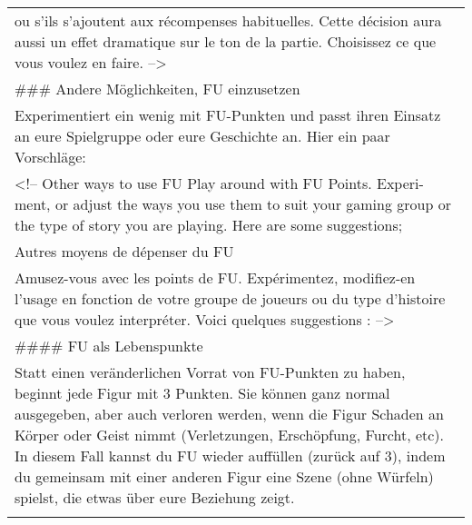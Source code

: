 \documentclass[]{article}
\begin{document}
\begin{longtable}[]{@{}l@{}}
\begin{minipage}[t]{0.05\columnwidth}
ou s'ils s'ajoutent aux récompenses habituelles. Cette décision aura
aussi un effet dramatique sur le ton de la partie. Choisissez ce que
vous voulez en faire. --\textgreater{}
\strut\end{minipage}\tabularnewline
\begin{minipage}[t]{0.05\columnwidth}\raggedright\strut
\#\#\# Andere Möglichkeiten, FU einzusetzen
\strut\end{minipage}\tabularnewline
\begin{minipage}[t]{0.05\columnwidth}\raggedright\strut
Experimentiert ein wenig mit FU-Punkten und passt ihren Einsatz an eure
Spielgruppe oder eure Geschichte an. Hier ein paar Vorschläge:
\strut\end{minipage}\tabularnewline
\begin{minipage}[t]{0.05\columnwidth}\raggedright\strut
\textless{}!-- Other ways to use FU Play around with FU Points. Experi-
ment, or adjust the ways you use them to suit your gaming group or the
type of story you are playing. Here are some suggestions;
\strut\end{minipage}\tabularnewline
\begin{minipage}[t]{0.05\columnwidth}\raggedright\strut
Autres moyens de dépenser du FU
\strut\end{minipage}\tabularnewline
\begin{minipage}[t]{0.05\columnwidth}\raggedright\strut
Amusez-vous avec les points de FU. Expérimentez, modifiez-en l'usage en
fonction de votre groupe de joueurs ou du type d'histoire que vous
voulez interpréter. Voici quelques suggestions : --\textgreater{}
\strut\end{minipage}\tabularnewline
\begin{minipage}[t]{0.05\columnwidth}\raggedright\strut
\#\#\#\# FU als Lebenspunkte
\strut\end{minipage}\tabularnewline
\begin{minipage}[t]{0.05\columnwidth}\raggedright\strut
Statt einen veränderlichen Vorrat von FU-Punkten zu haben, beginnt jede
Figur mit 3 Punkten. Sie können ganz normal ausgegeben, aber auch
verloren werden, wenn die Figur Schaden an Körper oder Geist nimmt
(Verletzungen, Erschöpfung, Furcht, etc). In diesem Fall kannst du FU
wieder auffüllen (zurück auf 3), indem du gemeinsam mit einer anderen
Figur eine Szene (ohne Würfeln) spielst, die etwas über eure Beziehung
zeigt.
\strut\end{minipage}\tabularnewline
\begin{minipage}[t]{0.05\columnwidth}\raggedright\strut

\end{minipage}
\end{longtable}
\end{document}
